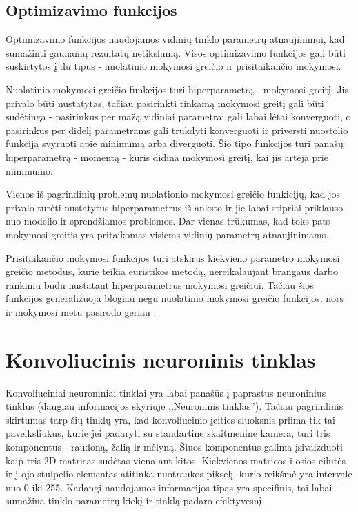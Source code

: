 \documentclass{VUMIFPSkursinis}
\begin{document}
\subsection{Optimizavimo funkcijos}
Optimizavimo funkcijos naudojamos vidinių tinklo parametrų atnaujinimui, kad sumažinti gaunamų rezultatų netikslumą. 
Visos optimizavimo funkcijos gali būti suskirtytos į du tipus - nuolatinio mokymosi greičio ir prisitaikančio mokymosi.

Nuolatinio mokymosi greičio funkcijos turi hiperparametrą - mokymosi greitį. Jis privalo būti nustatytas, tačiau 
pasirinkti tinkamą mokymosi greitį gali būti sudėtinga - pasirinkus per mažą vidiniai parametrai gali labai lėtai 
konverguoti, o pasirinkus per didelį parametrams gali trukdyti konverguoti ir priversti nuostolio funkciją svyruoti
apie minimumą arba diverguoti. Šio tipo funkcijos turi panašų hiperparametrą - momentą - kuris didina mokymosi greitį, 
kai jis artėja prie minimumo. 

Vienos iš pagrindinių problemų nuolationio mokymosi greičio funkicijų, kad jos privalo turėti nustatytus hiperparametrus 
iš anksto ir jie labai stipriai priklauso nuo modelio ir sprendžiamos problemos. Dar vienas trūkumas, kad toks pats 
mokymosi greitis yra pritaikomas visiems vidinių parametrų atnaujinimams.

Prisitaikančio mokymosi funkcijos turi atskirus kiekvieno parametro mokymosi greičio metodus, kurie teikia euristikos 
metodą, nereikalaujant brangaus darbo rankiniu būdu nustatant hiperparametrus mokymosi greičiui. Tačiau šios funkcijos 
generalizuoja blogiau negu nuolatinio mokymosi greičio funkcijos, nors ir mokymosi metu pasirodo geriau \cite{2017arXiv170508292W}.



\section{Konvoliucinis neuroninis tinklas}
Konvoliuciniai neuroniniai tinklai yra labai panašūs į paprastus neuroninius tinklus (daugiau informacijos skyriuje ,,Neuroninis
tinklas''). Tačiau pagrindinis skirtumas tarp šių tinklų yra, kad konvoliucinio įeities sluoksnis priima tik tai paveiksliukus, 
kurie jei padaryti su standartine skaitmenine kamera, turi tris komponentus - raudoną, žalią ir mėlyną. Šiuos komponentus galima 
įsivaizduoti kaip tris 2D matricas sudėtas viena ant kitos. Kiekvienos matricos i-osios eilutės ir j-ojo stulpelio elementas 
atitinka nuotraukos pikselį, kurio reikšmė yra intervale nuo 0 iki 255. Kadangi naudojamos informacijos tipas yra specifinis, 
tai labai sumažina tinklo parametrų kiekį ir tinklą padaro efektyvesnį.
\end{document}
